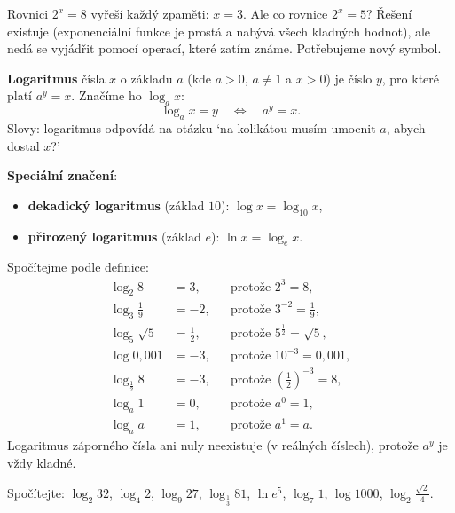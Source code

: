 Rovnici $2^x = 8$ vyřeší každý zpaměti: $x = 3$. Ale co rovnice $2^x = 5$? Řešení existuje (exponenciální funkce je prostá a nabývá všech kladných hodnot), ale nedá se vyjádřit pomocí operací, které zatím známe. Potřebujeme nový symbol.

\begin{definitionbox}
  \textbf{Logaritmus} čísla $x$ o základu $a$ (kde $a > 0$, $a\neq 1$ a $x > 0$) je číslo $y$, pro které platí $a^y = x$. Značíme ho $\log_a x$:
  \begin{equation*}
    \log_a x = y\quad\Leftrightarrow\quad a^y = x.
  \end{equation*}
  Slovy: logaritmus odpovídá na otázku `na kolikátou musím umocnit $a$, abych dostal $x$?'

  \vspace{0.2cm}

  \textbf{Speciální značení}:
  \begin{itemize}
    \item \textbf{dekadický logaritmus} (základ $10$): $\log x = \log_{10} x$,
    \item \textbf{přirozený logaritmus} (základ $e$): $\ln x = \log_e x$.
  \end{itemize}
\end{definitionbox}

\begin{example}
  Spočítejme podle definice:
  \begin{align*}
    \log_2 8 &= 3, &&\text{protože } 2^3 = 8,\\
    \log_3\tfrac{1}{9} &= -2, &&\text{protože } 3^{-2} = \tfrac{1}{9},\\
    \log_5\sqrt{5} &= \tfrac{1}{2}, &&\text{protože } 5^{\frac{1}{2}} = \sqrt{5},\\
    \log 0{,}001 &= -3, &&\text{protože } 10^{-3} = 0{,}001,\\
    \log_{\frac{1}{2}} 8 &= -3, &&\text{protože } {\left(\tfrac{1}{2}\right)}^{-3} = 8,\\
    \log_a 1 &= 0, &&\text{protože } a^0 = 1,\\
    \log_a a &= 1, &&\text{protože } a^1 = a.
  \end{align*}
  Logaritmus záporného čísla ani nuly neexistuje (v reálných číslech), protože $a^y$ je vždy kladné.
\end{example}

\begin{problem}
  Spočítejte: $\log_2 32$, $\log_4 2$, $\log_9 27$, $\log_{\frac{1}{3}} 81$, $\ln e^5$, $\log_7 1$, $\log 1000$, $\log_2\frac{\sqrt{2}}{4}$.
\end{problem}

